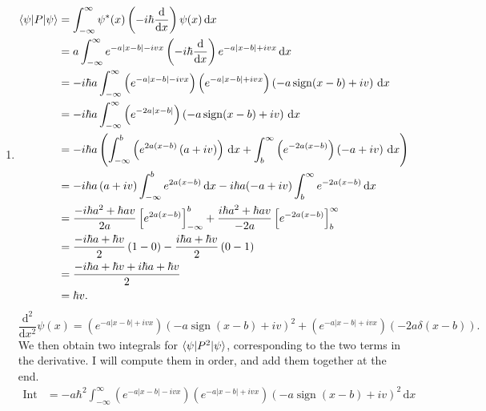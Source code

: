 \documentclass[11pt, letterpaper]{article}
\begin{document}
\begin{enumerate}
\begin{align*}
				      &=\frac{\left| A \right| ^2}{a} \\
				      &\equiv 1
		.\end{align*}
		It follows that $A=\pm \sqrt{a} $.
	\item 
		\begin{align*}
			\langle\psi \rvert P\lvert\psi \rangle &=\int_{-\infty }^{\infty } \psi^*(x)\left( -i\hbar \frac{\mathrm{d}}{\mathrm{d}x}  \right) \psi (x) \,\mathrm{d} x\\
						 &=a\int_{-\infty }^{\infty } e^{-a|x-b|-ivx} \left( -i\hbar \frac{\mathrm{d}}{\mathrm{d}x}  \right) e^{-a|x-b|+ivx}  \,\mathrm{d} x\\
						 &=-i\hbar a\int_{-\infty }^{\infty } \left( e^{-a|x-b|-ivx}  \right) \left( e^{-a|x-b|+ivx}  \right) \left( -a \operatorname{sign} (x-b)+iv \right)  \,\mathrm{d} x\\
						 &=-i\hbar a\int_{-\infty }^{\infty } \left( e^{-2a|x-b|}  \right) \left( -a \operatorname{sign} (x-b)+iv \right)  \,\mathrm{d} x\\
						 &=-i\hbar a\left( \int_{-\infty }^{b} \left( e^{2a(x-b)} \left( a+iv \right)  \right)  \,\mathrm{d} x+\int_{b}^{\infty } \left( e^{-2a(x-b)}  \right) \left( -a+iv \right)  \,\mathrm{d} x \right) \\
						 &=-i\hbar a\left( a+iv \right) \int_{-\infty }^{b} e^{2a(x-b)}  \,\mathrm{d} x-i\hbar a(-a+iv)\int_{b}^{\infty } e^{-2a(x-b)}  \,\mathrm{d} x\\
						 &=\frac{-i\hbar a^2+\hbar av}{2a} \left[ e^{2a(x-b)} \right]_{-\infty }^{b} +\frac{i\hbar a^2+\hbar av}{-2a} \left[ e^{-2a(x-b)}  \right]_b^{\infty } \\
						 &=\frac{-i\hbar a+\hbar v}{2} \left( 1-0 \right) -\frac{i\hbar a+\hbar v}{2} \left( 0-1 \right) \\
						 &=\frac{-i\hbar a+\hbar v+i\hbar a+\hbar v}{2} \\
						 &=\hbar v
		.\end{align*}
		\[
			\frac{\mathrm{d}^2}{\mathrm{d}x^2} \psi (x)=\left( e^{-a|x-b|+ivx}  \right) \left( -a \operatorname{sign} (x-b)+iv \right)^2 +\left( e^{-a|x-b|+ivx}  \right) \left( -2a\delta (x-b) \right) 
		.\]
		We then obtain two integrals for $\langle\psi \rvert P^2\lvert\psi \rangle $, corresponding to the two terms in the derivative. I will compute them in order, and add them together at the end.
		\begin{align*}
			\text{Int 1} &=-a\hbar ^2\int_{-\infty }^{\infty } \left( e^{-a|x-b|-ivx}  \right) \left( e^{-a|x-b|+ivx}  \right) \left( -a \operatorname{sign} (x-b)+iv \right) ^2 \,\mathrm{d} x\\

\end{align*}
\end{enumerate}
\end{document}

